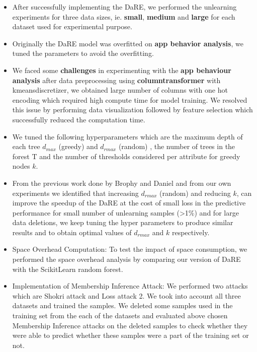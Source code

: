 \documentclass[11pt,letterpaper]{article}
\begin{document}
\begin{itemize}
    \item After successfully implementing the DaRE, we performed the unlearning experiments for three data sizes, ie. \textbf{small}, \textbf{medium} and \textbf{large} for each dataset used for experimental purpose.
    \item Originally the DaRE model was overfitted on \textbf{app behavior analysis}, we tuned the parameters to avoid the overfitting.
    \item We faced some \textbf{challenges} in experimenting with the \textbf{app behaviour analysis} after data preprocessing using \textbf{columntransformer} with kmeansdiscretizer, we obtained large number of columns with one hot encoding which required high compute time for model training. We resolved this issue by performing data visualization followed by feature selection which successfully reduced the computation time.
    \item We tuned the following hyperparameters which are the maximum depth of each tree $d_{max}$ (greedy) and $d_{rmax}$ (random) , the number of trees in the forest T and the number of thresholds considered per attribute for greedy nodes $k$.
    \item From the previous work done by Brophy and Daniel and from our own experiments we identified that increasing $d_{rmax}$ (random) and reducing $k$, can improve the speedup of the DaRE at the cost of small loss in the predictive performance for small number of unlearning samples (>1\%) and for large data deletions, we keep tuning the hyper parameters to produce similar results and to obtain optimal values of  $d_{rmax}$ and $k$ respectively.
    \item Space Overhead Computation: To test the impact of space consumption, we performed the space overhead analysis by comparing our version of DaRE with the ScikitLearn random forest.
    \item Implementation of Membership Inference Attack: We performed two attacks which are Shokri attack and Loss attack 2. We took into account all three datasets and trained the samples. We deleted some samples used in the training set from the each of the datasets and evaluated above chosen Membership Inference attacks on the deleted samples to check whether they were able to predict whether these samples were a part of the training set or not.
    
\end{itemize}
\end{document}
